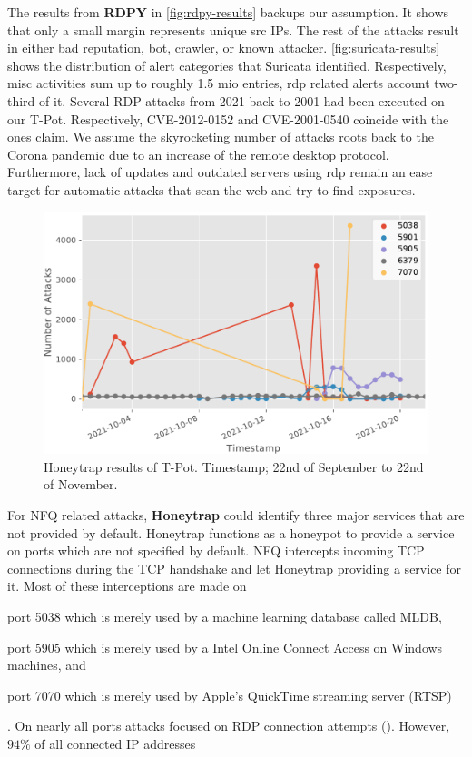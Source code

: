 The results from \textbf{RDPY} in \autoref{fig:rdpy-results} backups our assumption.
It shows that only a small margin represents unique src IPs.
The rest of the attacks result in either bad reputation, bot, crawler, or known attacker.
\autoref{fig:suricata-results} shows the distribution of alert categories that Suricata identified.
Respectively, misc activities sum up to roughly 1.5 mio entries, \ac{rdp} related alerts account two-third of it.
Several RDP attacks from 2021 back to 2001 had been executed on our T-Pot.
Respectively, CVE-2012-0152 and CVE-2001-0540 coincide with the ones \citet{Kelly2021} claim.
We assume the skyrocketing number of attacks roots back to the Corona pandemic due to an increase of the remote desktop protocol.
Furthermore, lack of updates and outdated servers using \ac{rdp} remain an ease target for automatic attacks that scan the web and try to find exposures.

\begin{figure}[ht]
    \centering
    \includegraphics[width=\textwidth]{figures/tpot-honeytrap-port.pdf}
    \caption[Honeytrap results of T-Pot]{Honeytrap results of T-Pot. Timestamp; 22nd of September to 22nd of November.}
    \label{fig:honeytrap-results}
\end{figure}

For NFQ related attacks, \textbf{Honeytrap} could identify three major services that are not provided by default.
Honeytrap functions as a honeypot to provide a service on ports which are not specified by default.
NFQ intercepts incoming TCP connections during the TCP handshake and let Honeytrap providing a service for it.
Most of these interceptions are made on
\begin{enumerate*}[label=(\roman*)]
    \item port 5038 which is merely used by a machine learning database called MLDB,
    \item port 5905 which is merely used by a Intel Online Connect Access on Windows machines, and
    \item port 7070 which is merely used by Apple's QuickTime streaming server (RTSP)
\end{enumerate*}.
On nearly all ports attacks focused on RDP connection attempts ().
However, $94\%$ of all connected IP addresses 

